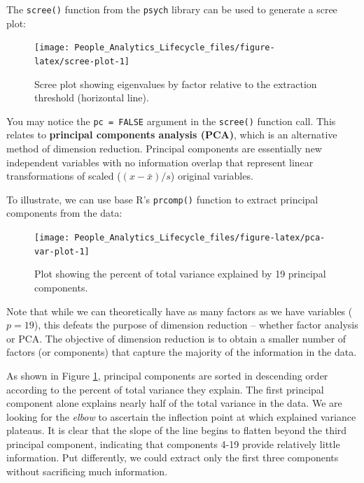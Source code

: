 \documentclass[
]{book}
\begin{document}
The \texttt{scree()} function from the \texttt{psych} library can be used to generate a scree plot:

\begin{figure}

{\centering \texttt{[image: People\_Analytics\_Lifecycle\_files/figure-latex/scree-plot-1]} 

}

\caption{Scree plot showing eigenvalues by factor relative to the extraction threshold (horizontal line).}\label{fig:scree-plot}
\end{figure}

You may notice the \texttt{pc\ =\ FALSE} argument in the \texttt{scree()} function call. This relates to \textbf{principal components analysis (PCA)}, which is an alternative method of dimension reduction. Principal components are essentially new independent variables with no information overlap that represent linear transformations of scaled (\((x - \bar{x}) / s\)) original variables.

To illustrate, we can use base R's \texttt{prcomp()} function to extract principal components from the data:

\begin{figure}

{\centering \texttt{[image: People\_Analytics\_Lifecycle\_files/figure-latex/pca-var-plot-1]} 

}

\caption{Plot showing the percent of total variance explained by 19 principal components.}\label{fig:pca-var-plot}
\end{figure}

Note that while we can theoretically have as many factors as we have variables (\(p = 19\)), this defeats the purpose of dimension reduction -- whether factor analysis or PCA. The objective of dimension reduction is to obtain a smaller number of factors (or components) that capture the majority of the information in the data.

As shown in Figure \ref{fig:scree-plot}, principal components are sorted in descending order according to the percent of total variance they explain. The first principal component alone explains nearly half of the total variance in the data. We are looking for the \emph{elbow} to ascertain the inflection point at which explained variance plateaus. It is clear that the slope of the line begins to flatten beyond the third principal component, indicating that components 4-19 provide relatively little information. Put differently, we could extract only the first three components without sacrificing much information.
\end{document}
